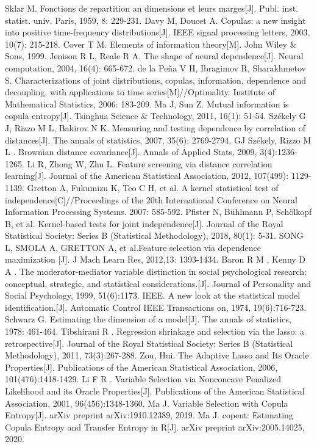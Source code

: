 \documentclass[a4paper]{ctexart}
\begin{document}
\begin{thebibliography}{99} 
 Sklar M. Fonctions de repartition an dimensions et leurs marges[J]. Publ. inst. statist. univ. Paris, 1959, 8: 229-231.
Davy M, Doucet A. Copulas: a new insight into positive time-frequency distributions[J]. IEEE signal processing letters, 2003, 10(7): 215-218.
Cover T M. Elements of information theory[M]. John Wiley \& Sons, 1999.
Jenison R L, Reale R A. The shape of neural dependence[J]. Neural computation, 2004, 16(4): 665-672.
de la Peña V H, Ibragimov R, Sharakhmetov S. Characterizations of joint distributions, copulas, information, dependence and decoupling, with applications to time series[M]//Optimality. Institute of Mathematical Statistics, 2006: 183-209.
Ma J, Sun Z. Mutual information is copula entropy[J]. Tsinghua Science \& Technology, 2011, 16(1): 51-54.
Székely G J, Rizzo M L, Bakirov N K. Measuring and testing dependence by correlation of distances[J]. The annals of statistics, 2007, 35(6): 2769-2794.
GJ Székely,  Rizzo M L . Brownian distance covariance[J]. Annals of Applied Stats, 2009, 3(4):1236-1265.
Li R, Zhong W, Zhu L. Feature screening via distance correlation learning[J]. Journal of the American Statistical Association, 2012, 107(499): 1129-1139.
Gretton A, Fukumizu K, Teo C H, et al. A kernel statistical test of independence[C]//Proceedings of the 20th International Conference on Neural Information Processing Systems. 2007: 585-592.
Pfister N, Bühlmann P, Schölkopf B, et al. Kernel‐based tests for joint independence[J]. Journal of the Royal Statistical Society: Series B (Statistical Methodology), 2018, 80(1): 5-31.
 SONG L, SMOLA A, GRETTON A, et al.Feature selection via dependence maximization [J]. J Mach Learn Res, 2012,13: 1393-1434.
Baron R M ,  Kenny D A . The moderator-mediator variable distinction in social psychological research: conceptual, strategic, and statistical considerations.[J]. Journal of Personality and Social Psychology, 1999, 51(6):1173.
IEEE. A new look at the statistical model identification.[J]. Automatic Control IEEE Transactions on, 1974, 19(6):716-723. 
Schwarz G. Estimating the dimension of a model[J]. The annals of statistics, 1978: 461-464.
 Tibshirani R . Regression shrinkage and selection via the lasso: a retrospective[J]. Journal of the Royal Statistical Society: Series B (Statistical Methodology), 2011, 73(3):267-288.
Zou, Hui. The Adaptive Lasso and Its Oracle Properties[J]. Publications of the American Statistical Association, 2006, 101(476):1418-1429.
 Li F R . Variable Selection via Nonconcave Penalized Likelihood and its Oracle Properties[J]. Publications of the American Statistical Association, 2001, 96(456):1348-1360.
 Ma J. Variable Selection with Copula Entropy[J]. arXiv preprint arXiv:1910.12389, 2019.
 Ma J. copent: Estimating Copula Entropy and Transfer Entropy in R[J]. arXiv preprint arXiv:2005.14025, 2020.
\end{thebibliography}
\end{document}
